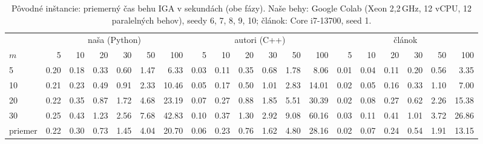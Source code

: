 \begin{table}[ht]
\centering
\scriptsize
\setlength{\tabcolsep}{3pt}
\caption{Pôvodné inštancie: priemerný čas behu IGA v sekundách (obe fázy). Naše behy: Google Colab (Xeon 2,2\,GHz, 12 vCPU, 12 paralelných behov), seedy 6, 7, 8, 9, 10; článok: Core i7-13700, seed 1.}
\label{tab:orig_time}
\begin{tabular}{l|rrrrrr|rrrrrr|rrrrrr}
\toprule
 & \multicolumn{6}{c}{naša (Python)} & \multicolumn{6}{c}{autori (C++)} & \multicolumn{6}{c}{článok} \\
$m$ & 5 & 10 & 20 & 30 & 50 & 100 & 5 & 10 & 20 & 30 & 50 & 100 & 5 & 10 & 20 & 30 & 50 & 100 \\
\midrule
5 & 0.20 & 0.18 & 0.33 & 0.60 & 1.47 & 6.33 & 0.03 & 0.11 & 0.35 & 0.68 & 1.78 & 8.06 & 0.01 & 0.04 & 0.11 & 0.20 & 0.56 & 3.35 \\
10 & 0.21 & 0.23 & 0.49 & 0.91 & 2.33 & 10.46 & 0.05 & 0.17 & 0.50 & 1.01 & 2.83 & 14.01 & 0.02 & 0.05 & 0.16 & 0.33 & 1.10 & 7.00 \\
20 & 0.22 & 0.35 & 0.87 & 1.72 & 4.68 & 23.19 & 0.07 & 0.27 & 0.88 & 1.85 & 5.51 & 30.39 & 0.02 & 0.08 & 0.27 & 0.62 & 2.26 & 15.38 \\
30 & 0.25 & 0.43 & 1.23 & 2.56 & 7.68 & 42.83 & 0.10 & 0.37 & 1.30 & 2.92 & 9.08 & 60.16 & 0.03 & 0.11 & 0.41 & 1.01 & 3.72 & 26.86 \\
\midrule
priemer & 0.22 & 0.30 & 0.73 & 1.45 & 4.04 & 20.70 & 0.06 & 0.23 & 0.76 & 1.62 & 4.80 & 28.16 & 0.02 & 0.07 & 0.24 & 0.54 & 1.91 & 13.15 \\
\bottomrule
\end{tabular}
\end{table}
